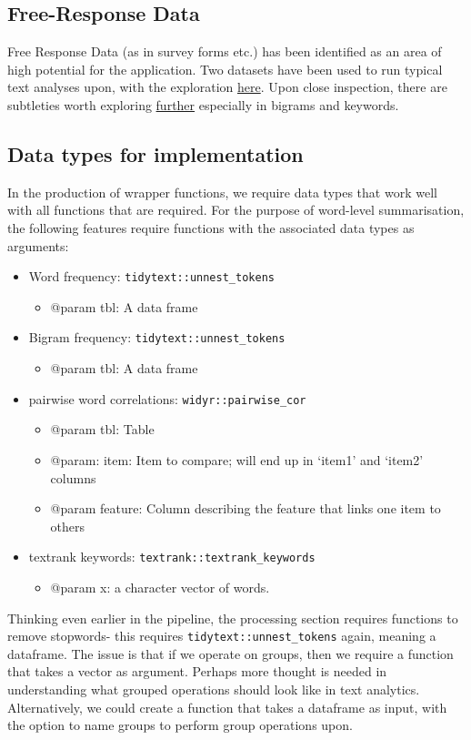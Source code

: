 \documentclass[a4paper, 11pt]{article}
\begin{document}
\subsection{Free-Response Data}
\label{sec:orgacf5952}
Free Response Data (as in survey forms etc.) has been identified as an
area of high potential for the application. Two datasets have been
used to run typical text analyses upon, with the exploration \href{free-response.Rmd}{here}.
Upon close inspection, there are subtleties worth exploring \href{further-free-response.org}{further}
especially in bigrams and keywords.
\subsection{Data types for implementation}
\label{sec:orga571eca}
In the production of wrapper functions, we require data types that
work well with all functions that are required. For the purpose of
word-level summarisation, the following features require functions with the
associated data types as arguments:
\begin{itemize}
\item Word frequency: \texttt{tidytext::unnest\_tokens}
\begin{itemize}
\item @param tbl: A data frame
\end{itemize}
\item Bigram frequency: \texttt{tidytext::unnest\_tokens}
\begin{itemize}
\item @param tbl: A data frame
\end{itemize}
\item pairwise word correlations: \texttt{widyr::pairwise\_cor}
\begin{itemize}
\item @param tbl: Table
\item @param: item: Item to compare; will end up in ‘item1’ and ‘item2’
columns
\item @param feature: Column describing the feature that links one item
to others
\end{itemize}
\item textrank keywords: \texttt{textrank::textrank\_keywords}
\begin{itemize}
\item @param x: a character vector of words.
\end{itemize}
\end{itemize}

Thinking even earlier in the pipeline, the processing section requires
functions to remove stopwords- this requires \texttt{tidytext::unnest\_tokens}
again, meaning a dataframe. The issue is that if we operate on groups,
then we require a function that takes a vector as argument. Perhaps
more thought is needed in understanding what grouped operations should
look like in text analytics. Alternatively, we could create a function
that takes a dataframe as input, with the option to name groups to
perform group operations upon. 
\end{document}
